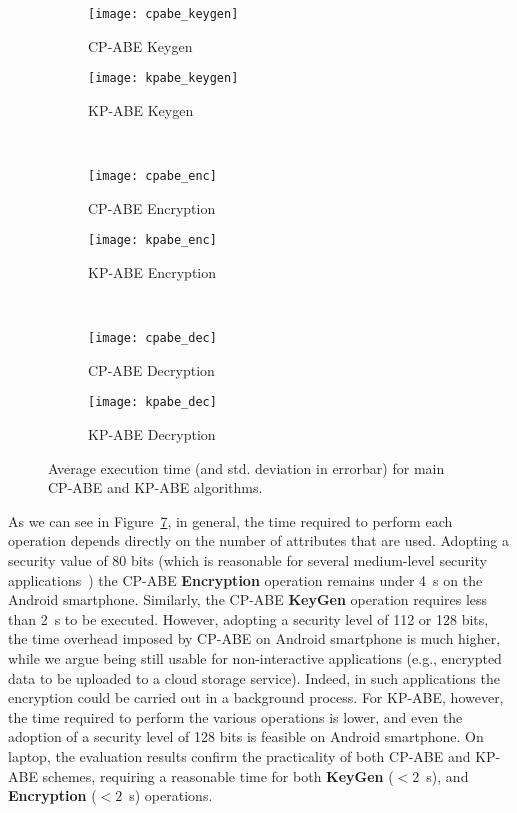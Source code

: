 \documentclass{sig-alternate-2013}
\begin{document}
\begin{figure}[h!]
	\centering
	\begin{subfigure}[b]{\picboxsize}
\texttt{[image: cpabe\_keygen]}
		\caption{CP-ABE Keygen}
		\label{cpabe_keygen_android}
	\end{subfigure}
	\begin{subfigure}[b]{\picboxsize}
\texttt{[image: kpabe\_keygen]}
		\caption{KP-ABE Keygen}
		\label{kpabe_keygen_android}
	\end{subfigure}
	\\
	\begin{subfigure}[b]{\picboxsize}
\texttt{[image: cpabe\_enc]}
		\caption{CP-ABE Encryption}
		\label{cpabe_enc_android}
	\end{subfigure}
	\begin{subfigure}[b]{\picboxsize}
\texttt{[image: kpabe\_enc]}
		\caption{KP-ABE Encryption}
		\label{kpabe_enc_android}
	\end{subfigure}
	\\
	\begin{subfigure}[b]{\picboxsize}
\texttt{[image: cpabe\_dec]}
		\caption{CP-ABE Decryption}
		\label{cpabe_dec_android}
	\end{subfigure}
	\begin{subfigure}[b]{\picboxsize}
\texttt{[image: kpabe\_dec]}
		\caption{KP-ABE Decryption}
		\label{kpabe_dec_android}
	\end{subfigure}
	\caption{Average execution time (and std. deviation in errorbar) for main CP-ABE and KP-ABE algorithms.}
	\label{fig:time_android}
\end{figure}
 
 As we can see in Figure~\ref{fig:time_android}, in general, the time required to perform each operation depends directly on the number of attributes that are used. Adopting a security value of 80 bits (which is reasonable for several medium-level security applications~\cite{cryptoeprint:2009:389}) the CP-ABE {\bf Encryption} operation remains under 4~s on the Android smartphone. Similarly, the CP-ABE {\bf KeyGen} operation requires less than 2~s to be executed. However, adopting a security level of 112 or 128 bits, the time overhead imposed by CP-ABE on Android smartphone is much higher, while we argue being still usable for non-interactive applications (e.g., encrypted data to be uploaded to a cloud storage service). Indeed, in such applications the encryption could be carried out in a background process. 
 For KP-ABE, however, the time required to perform the various operations is lower, and even the adoption of a security level of 128 bits is feasible on Android smartphone. 
 On laptop, the evaluation results confirm the practicality of both CP-ABE and KP-ABE schemes, requiring a reasonable time for both {\bf KeyGen} ($<\!2$~s), and {\bf Encryption} ($<\!2$~s) operations.
 
\end{document}
